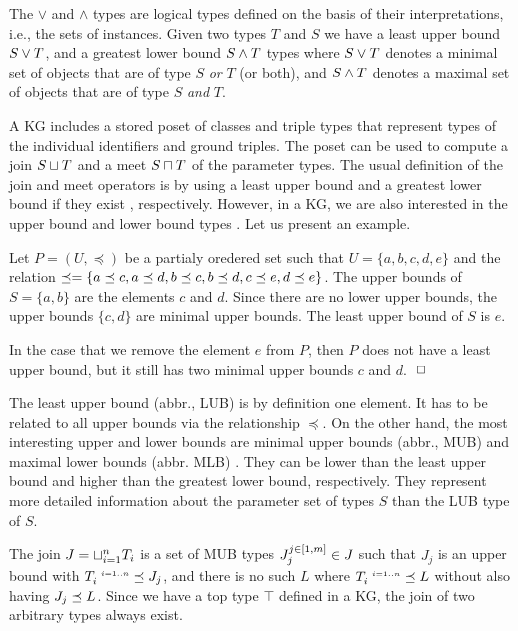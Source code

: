 \documentclass[runningheads]{llncs}
\newcommand{\s}{\scriptscriptstyle\ \,}
\newcommand{\finbox}{\phantom{.}\hfill\Box}
\begin{document}
The $\lor$ and $\land$ types are logical types defined on the basis of
their interpretations, i.e., the sets of instances. Given two types
$T$ and $S$ we have a least upper bound $S\lor\/T$, and a greatest
lower bound $S\land\/T$ types where $S\lor\/T$ denotes a minimal set
of objects that are of type $S$ \emph{or} $T$ (or both), and
$S\land\/T$ denotes a maximal set of objects that are of type $S$
\emph{and} $T$.

A KG includes a stored poset of classes and triple types that
represent types of the individual identifiers and ground triples. The
poset can be used to compute a join $S\sqcup\/T$ and a meet
$S\sqcap\/T$ of the parameter types. The usual definition of the join
and meet operators is by using a least upper bound and a greatest
lower bound if they exist \cite{Pierce2002}, respectively. However, in
a KG, we are also interested in the upper bound and lower bound types
\cite{DaveyPriestley2002}. Let us present an example.

\begin{example}
  Let $P=(U,\preceq)$ be a partialy oredered set such that
  $U=\{a,b,c,d,e\}$ and the relation
  $\preceq=\{a\preceq\/c,a\preceq\/d,b\preceq\/c,b\preceq\/d,c\preceq\/e,d\preceq\/e\}$.
  The upper bounds of $S=\{a,b\}$ are the elements $c$ and $d$. Since
  there are no lower upper bounds, the upper bounds $\{c,d\}$ are
  minimal upper bounds. The least upper bound of $S$ is $e$.

  In the case that we remove the element $e$ from $P$, then $P$ does
  not have a least upper bound, but it still has two minimal upper
  bounds $c$ and $d$. $\finbox$
\end{example}

The least upper bound (abbr., LUB) is by definition one element. It
has to be related to all upper bounds via the relationship
$\preceq$. On the other hand, the most interesting upper and lower
bounds are minimal upper bounds (abbr., MUB) and maximal lower bounds
(abbr. MLB) \cite{Knudstorp2024}. They can be lower than the least
upper bound and higher than the greatest lower bound,
respectively. They represent more detailed information about the
parameter set of types $S$ than the LUB type of $S$.

The join $J=\sqcup_{i=1}^n\/T_i$ is a set of MUB types
$J_j^{j\in[1,m]}\in\/J$ such that $J_j$ is an upper bound with
$T_i^{\s\/i=1..n}\preceq\/J_j$, and there is no such $L$ where
$T_i^{\s\/i=1..n}\preceq\/L$ without also having
$J_j\preceq\/L$. Since we have a top type $\top$ defined in a KG, the
join of two arbitrary types always exist.
\end{document}
